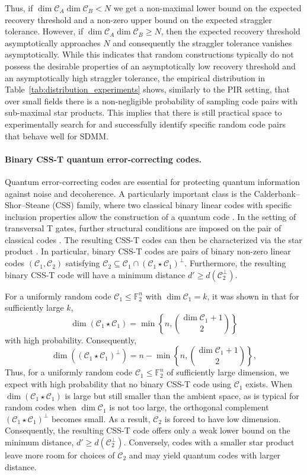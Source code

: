 \documentclass[a4paper,11pt,reqno]{article}
\newcommand{\F}{\mathbb{F}}
\newcommand{\C}{\mathcal{C}}
\theoremstyle{plain} \numberwithin{equation}{section}
\theoremstyle{definition}
\begin{document}
{
 
Thus, if $\dim\C_A \dim \C_B < N$ we get a non-maximal lower bound on the expected recovery threshold and a non-zero upper bound on the expected straggler tolerance. However, if $\dim\C_A \dim \C_B \geq N$, then the expected recovery threshold asymptotically approaches $N$ and consequently the straggler tolerance vanishes asymptotically. While this indicates that random constructions typically do not possess the desirable properties of an asymptotically low recovery threshold and an asymptotically high straggler tolerance, the empirical distribution in Table~\ref{tab:distribution_experiments} shows, similarly to the PIR setting, that over small fields there is a non-negligible probability of sampling code pairs with sub-maximal star products. This implies that there is still practical space to experimentally search for and successfully identify specific random code pairs that behave well for SDMM.
}




\paragraph{Binary CSS-T quantum error-correcting codes.}
Quantum error-correcting codes are essential for protecting quantum information against noise and decoherence. A particularly important class is the Calderbank–Shor–Steane (CSS) family, where two classical binary linear codes with specific inclusion properties allow the construction of a quantum code \cite{CSS1,CSS2}. In the setting of transversal T gates, further structural conditions are imposed on the pair of classical codes \cite{CSST}. The resulting CSS-T codes can then be characterized via the star product \cite{camps2023algebraic}. In particular, binary CSS-T codes are pairs of binary non-zero linear codes $(\C_1,\C_2)$ satisfying $\C_2 \subseteq \C_1 \cap (\C_1 \star \C_1)^\perp.$ Furthermore, the resulting binary CSS-T code will have a minimum distance $d'\geq d(\C_2^\perp)$.

For a uniformly random code $\C_1\leq \F_2^n$ with $\dim \C_1 = k$, it was shown in \cite{cascudo2015squares} that for sufficiently large $k$, 
\[
    \dim (\C_1 \star \C_1 )= \min\left\{ n, \binom{\dim \C_1+1}{2}\right\}
\]
 with high probability. Consequently,
\[
    \dim ((\C_1\star \C_1)^\perp )= n  - \min\left\{ n,\binom{\dim \C_1+1}{2}\right\},
\]
Thus, for a uniformly random code $\C_1 \le \F_2^n$ of sufficiently large dimension, we expect with high probability that no binary CSS-T code using $\C_1$ exists. 
When $\dim(\C_1 \star \C_1)$ is large but still smaller than the ambient space, as is typical for random codes when $\dim \C_1$ is not too large, the orthogonal complement $(\C_1 \star \C_1)^\perp$ becomes small. As a result, $\C_2$ is forced to have low dimension. Consequently, the resulting CSS-T code offers only a weak lower bound on the minimum distance, $d' \ge d(\C_2^\perp)$. Conversely, codes with a smaller star product leave more room for choices of $\C_2$ and may yield quantum codes with larger distance.
\end{document}
